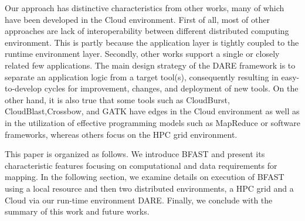 \documentclass{acm_proc_article-sp}
\begin{document}
 Our
approach has distinctive characteristics from other
works\cite{taylor2010,cloudburst, cloudblast,
  langmead2009,langmead2010,gatk,halligan2009,luyf-2010}, many of
which have been developed in the Cloud environment.  First of all,
most of other approaches are lack of interoperability between
different distributed computing environment.  This is partly because
the application layer is tightly coupled to the runtime environment
layer.  Secondly, other works support a single or closely related few
applications.  The main design strategy of the DARE framework is to
separate an application logic from a target tool(s), consequently
resulting in easy-to-develop cycles for improvement, changes, and
deployment of new tools.  On the other hand, it is also true that some
tools such as CloudBurst\cite{cloudburst},
CloudBlast\cite{cloudblast},Crossbow\cite{langmead2009}, and
GATK\cite{gatk} have edges in the Cloud environment as well as in the
utilization of effective programming models such as MapReduce or
software frameworks, whereas others\cite{luyf-2010} focus on the HPC
grid environment.

This paper is organized as follows.  We introduce BFAST and present its characteristic features focusing on computational and data requirements for mapping.  In the following section, we examine details on execution of BFAST using a local resource and then two distributed environments, a HPC grid and a Cloud via our run-time environment DARE.  Finally, we conclude with the summary of this work and future works.   




\end{document}
